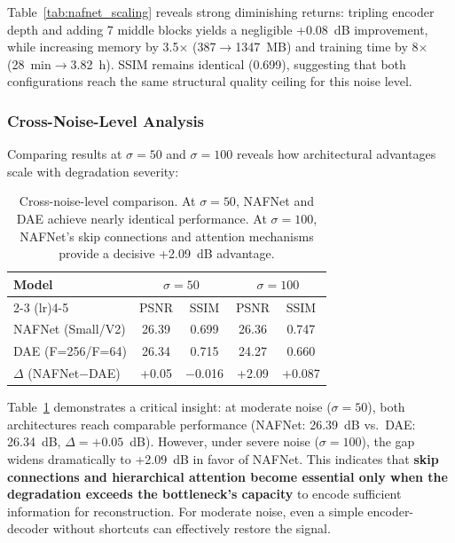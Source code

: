 Table~\ref{tab:nafnet_scaling} reveals strong diminishing returns: tripling encoder depth and adding 7 middle blocks yields a negligible +0.08~dB improvement, while increasing memory by 3.5$\times$ (387$\to$1347~MB) and training time by 8$\times$ (28~min$\to$3.82~h). SSIM remains identical (0.699), suggesting that both configurations reach the same structural quality ceiling for this noise level.

\subsubsection{Cross-Noise-Level Analysis}

Comparing results at $\sigma = 50$ and $\sigma = 100$ reveals how architectural advantages scale with degradation severity:

\begin{table}[t]
\centering
\small
\setlength{\tabcolsep}{3pt}
\begin{tabular}{lcccc}
\toprule
\textbf{Model} & \multicolumn{2}{c}{\textbf{$\sigma = 50$}} & \multicolumn{2}{c}{\textbf{$\sigma = 100$}} \\
\cmidrule(lr){2-3} \cmidrule(lr){4-5}
 & PSNR & SSIM & PSNR & SSIM \\
\midrule
NAFNet (Small/V2) & 26.39 & 0.699 & 26.36 & 0.747 \\
DAE (F=256/F=64) & 26.34 & 0.715 & 24.27 & 0.660 \\
\midrule
$\Delta$ (NAFNet$-$DAE) & +0.05 & $-$0.016 & +2.09 & +0.087 \\
\bottomrule
\end{tabular}
\caption{Cross-noise-level comparison. At $\sigma = 50$, NAFNet and DAE achieve nearly identical performance. At $\sigma = 100$, NAFNet's skip connections and attention mechanisms provide a decisive +2.09~dB advantage.}
\label{tab:cross_noise}
\end{table}

Table~\ref{tab:cross_noise} demonstrates a critical insight: at moderate noise ($\sigma = 50$), both architectures reach comparable performance (NAFNet: 26.39~dB vs.\ DAE: 26.34~dB, $\Delta = +0.05$~dB). However, under severe noise ($\sigma = 100$), the gap widens dramatically to +2.09~dB in favor of NAFNet. This indicates that \textbf{skip connections and hierarchical attention become essential only when the degradation exceeds the bottleneck's capacity} to encode sufficient information for reconstruction. For moderate noise, even a simple encoder-decoder without shortcuts can effectively restore the signal.

